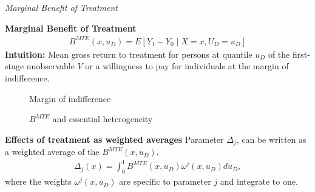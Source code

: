 \begin{frame}\begin{center}
		\LARGE\textit{Marginal Benefit of Treatment}
\end{center}\end{frame}
\begin{frame}\textbf{Marginal Benefit of Treatment}
	\begin{align*}
		B^{MTE}(x, u_D) = E [Y_1 - Y_0 \mid X = x,  U_D = u_D]
	\end{align*}
	\textbf{Intuition:} Mean gross return to treatment for persons at
	quantile \(u_D\) of the first-stage unobservable \(V\) or a willingness to pay for individuals at the margin of indifference.
\end{frame}
\begin{frame}
	\begin{figure}\caption{Margin of indifference}
	\end{figure}
\end{frame}
\begin{frame}
\begin{figure}\caption{$B^{MTE}$ and essential heterogeneity}
	\end{figure}
\end{frame}
\begin{frame}
	\textbf{Effects of treatment as weighted averages}
	Parameter \(\Delta_j\), can be written as a weighted average of the
	\(B^{MTE}(x, u_D)\).
	\begin{align*}
		\Delta_j(x) = \int_0^1 B^{MTE}(x, u_D) \omega^j(x, u_D) du_D,
	\end{align*}
	where the weights \(\omega^j(x, u_D)\) are specific to parameter \(j\)
	and integrate to one.
\end{frame}
